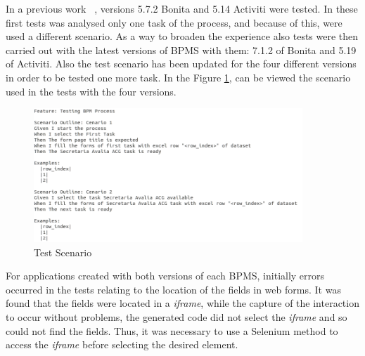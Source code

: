 \documentclass[runningheads,a4paper]{llncs}
\begin{document}



In a previous work ~\cite{sbqs2015}, versions 5.7.2 Bonita and 5.14 Activiti were tested. In these first tests was analysed only one task of the process, and because of this, were used a different scenario. As a way to broaden the experience also tests were then carried out with the latest versions of BPMS with them: 7.1.2 of Bonita and 5.19 of Activiti. Also the test scenario has been updated for the four different versions in order to be tested one more task. In the Figure \ref{fig:cenario2}, can be viewed the scenario used in the tests with the four versions.

\begin{figure}[ht]
\centering
\includegraphics[width=0.9\textwidth]{figuras/cenario2.png}
\caption{Test Scenario}
\label{fig:cenario2}
\end{figure}


For applications created with both versions of each BPMS, initially errors occurred in the tests relating to the location of the fields in web forms. It was found that the fields were located in a \emph{iframe}, while the capture of the interaction to occur without problems, the generated code did not select the \emph{iframe} and so could not find the fields. Thus, it was necessary to use a Selenium method to access the \emph{iframe} before selecting the desired element.
\end{document}
